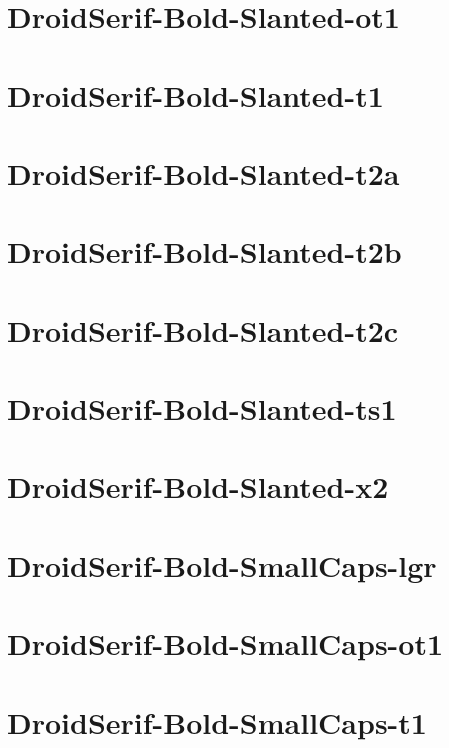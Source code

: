 \documentclass{article}
\begin{document}
\section{DroidSerif-Bold-Slanted-ot1}

\section{DroidSerif-Bold-Slanted-t1}

\section{DroidSerif-Bold-Slanted-t2a}

\section{DroidSerif-Bold-Slanted-t2b}

\section{DroidSerif-Bold-Slanted-t2c}

\section{DroidSerif-Bold-Slanted-ts1}

\section{DroidSerif-Bold-Slanted-x2}

\section{DroidSerif-Bold-SmallCaps-lgr}

\section{DroidSerif-Bold-SmallCaps-ot1}

\section{DroidSerif-Bold-SmallCaps-t1}
\end{document}
